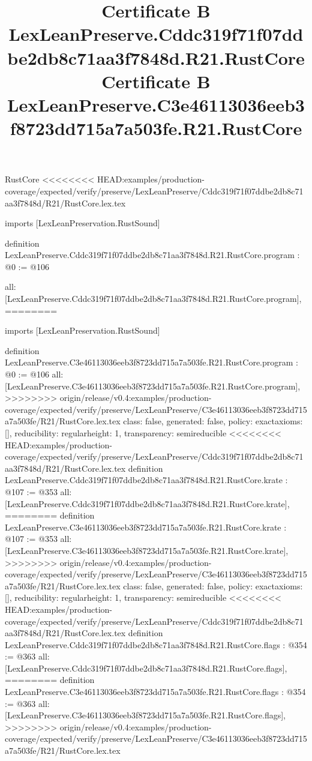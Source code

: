 \begin{lexlean}{RustCore}
<<<<<<<< HEAD:examples/production-coverage/expected/verify/preserve/LexLeanPreserve/Cddc319f71f07ddbe2db8c71aa3f7848d/R21/RustCore.lex.tex
\title{Certificate B LexLeanPreserve.Cddc319f71f07ddbe2db8c71aa3f7848d.R21.RustCore}
\begin{coremodule}
imports [LexLeanPreservation.RustSound]

definition LexLeanPreserve.Cddc319f71f07ddbe2db8c71aa3f7848d.R21.RustCore.program : @0 := @106 {
  all: [LexLeanPreserve.Cddc319f71f07ddbe2db8c71aa3f7848d.R21.RustCore.program],
========
\title{Certificate B LexLeanPreserve.C3e46113036eeb3f8723dd715a7a503fe.R21.RustCore}
\begin{coremodule}
imports [LexLeanPreservation.RustSound]

definition LexLeanPreserve.C3e46113036eeb3f8723dd715a7a503fe.R21.RustCore.program : @0 := @106 {
  all: [LexLeanPreserve.C3e46113036eeb3f8723dd715a7a503fe.R21.RustCore.program],
>>>>>>>> origin/release/v0.4:examples/production-coverage/expected/verify/preserve/LexLeanPreserve/C3e46113036eeb3f8723dd715a7a503fe/R21/RustCore.lex.tex
  class: false,
  generated: false,
  policy: exact{axioms: []},
  reducibility: regular{height: 1},
  transparency: semireducible
}
<<<<<<<< HEAD:examples/production-coverage/expected/verify/preserve/LexLeanPreserve/Cddc319f71f07ddbe2db8c71aa3f7848d/R21/RustCore.lex.tex
definition LexLeanPreserve.Cddc319f71f07ddbe2db8c71aa3f7848d.R21.RustCore.krate : @107 := @353 {
  all: [LexLeanPreserve.Cddc319f71f07ddbe2db8c71aa3f7848d.R21.RustCore.krate],
========
definition LexLeanPreserve.C3e46113036eeb3f8723dd715a7a503fe.R21.RustCore.krate : @107 := @353 {
  all: [LexLeanPreserve.C3e46113036eeb3f8723dd715a7a503fe.R21.RustCore.krate],
>>>>>>>> origin/release/v0.4:examples/production-coverage/expected/verify/preserve/LexLeanPreserve/C3e46113036eeb3f8723dd715a7a503fe/R21/RustCore.lex.tex
  class: false,
  generated: false,
  policy: exact{axioms: []},
  reducibility: regular{height: 1},
  transparency: semireducible
}
<<<<<<<< HEAD:examples/production-coverage/expected/verify/preserve/LexLeanPreserve/Cddc319f71f07ddbe2db8c71aa3f7848d/R21/RustCore.lex.tex
definition LexLeanPreserve.Cddc319f71f07ddbe2db8c71aa3f7848d.R21.RustCore.flags : @354 := @363 {
  all: [LexLeanPreserve.Cddc319f71f07ddbe2db8c71aa3f7848d.R21.RustCore.flags],
========
definition LexLeanPreserve.C3e46113036eeb3f8723dd715a7a503fe.R21.RustCore.flags : @354 := @363 {
  all: [LexLeanPreserve.C3e46113036eeb3f8723dd715a7a503fe.R21.RustCore.flags],
>>>>>>>> origin/release/v0.4:examples/production-coverage/expected/verify/preserve/LexLeanPreserve/C3e46113036eeb3f8723dd715a7a503fe/R21/RustCore.lex.tex
}}}
\end{coremodule}}
\end{coremodule}
\end{lexlean}
